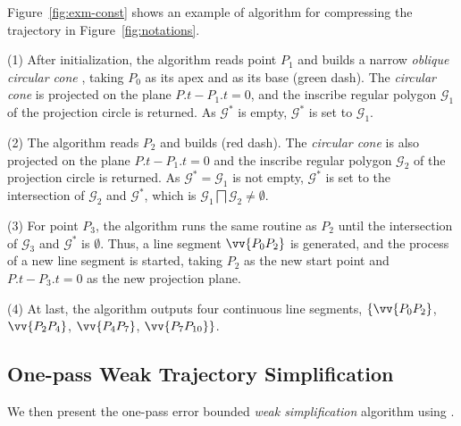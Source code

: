 \begin{example}
\label{exm-alg-conest}
Figure~\ref{fig:exm-const} shows an example of algorithm \cist for compressing the trajectory  in Figure~\ref{fig:notations}.

\sstab (1) After initialization, the \cist algorithm reads point $P_1$ and builds a narrow \emph{oblique circular cone} , taking $P_0$ as its apex and  as its base (green dash). The \emph{circular cone} is projected on the plane $P.t-P_1.t=0$, and the inscribe regular polygon $\mathcal{G}_1$ of the projection circle is returned. As $\mathcal{G}^*$ is empty, $\mathcal{G}^*$ is set to $\mathcal{G}_1$.

\sstab(2) The algorithm reads $P_2$ and builds  (red dash). The \emph{circular cone} is also projected on the plane $P.t-P_1.t=0$ and the inscribe regular polygon $\mathcal{G}_2$ of the projection circle is returned. As $\mathcal{G}^*=\mathcal{G}_1$ is not empty, $\mathcal{G}^*$ is set to the intersection of $\mathcal{G}_2$ and $\mathcal{G}^*$, which is $\mathcal{G}_1 \bigsqcap \mathcal{G}_2 \ne \emptyset$.

\sstab (3) For point $P_3$, the algorithm runs the same routine as $P_2$ until the intersection of $\mathcal{G}_3$ and $\mathcal{G}^*$ is $\emptyset$. Thus, a line segment $\vv{P_0P_2}$ is generated, and the process of a new line segment is started, taking $P_2$ as the new start point and $P.t-P_3.t=0$ as the new projection plane.

\sstab (4) At last, the algorithm outputs four continuous line segments, \ie $\{\vv{P_0P_2}$, $\vv{P_2P_4}$, $\vv{P_4P_{7}}$, $\vv{P_7P_{10}}\}$.
\end{example}





\subsection{One-pass Weak Trajectory Simplification}

We then present the one-pass error bounded {\em weak simplification} algorithm using \sed.




